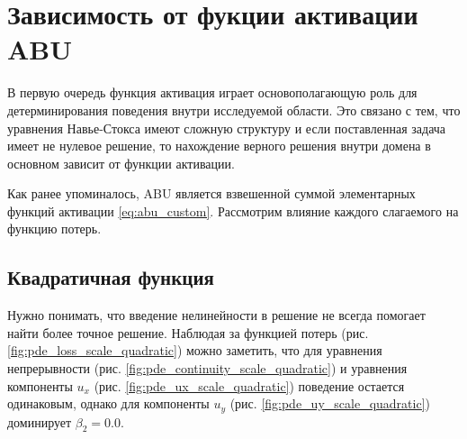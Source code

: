 \section{Зависимость от фукции активации ABU}

В первую очередь функция активация играет основополагающую роль для
детерминирования поведения внутри исследуемой области. Это связано с тем,
что уравнения Навье-Стокса имеют сложную структуру и если поставленная
задача имеет не нулевое решение, то нахождение верного решения внутри
домена в основном зависит от функции активации.

Как ранее упоминалось, ABU является взвешенной суммой элементарных функций
активации \eqref{eq:abu_custom}. Рассмотрим влияние каждого слагаемого на
функцию потерь.
\subsection{Квадратичная функция}
Нужно понимать, что введение нелинейности в решение не всегда помогает
найти более точное решение. Наблюдая за функцией потерь
(рис. \ref{fig:pde_loss_scale_quadratic}) можно заметить, что для уравнения
непрерывности (рис. \ref{fig:pde_continuity_scale_quadratic}) и уравнения
компоненты $u_x$ (рис. \ref{fig:pde_ux_scale_quadratic}) поведение 
остается одинаковым, однако для компоненты $u_y$ (рис. \ref{fig:pde_uy_scale_quadratic})
доминирует $\beta_2 = 0.0$.


